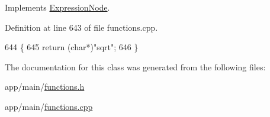 Implements \hyperlink{classExpressionNode_a42a5e9562b0f645a19dcc83f698069b5}{Expression\+Node}.



Definition at line 643 of file functions.\+cpp.


\begin{DoxyCode}
644 \{
645     \textcolor{keywordflow}{return} (\textcolor{keywordtype}{char}*)\textcolor{stringliteral}{"sqrt"};
646 \}
\end{DoxyCode}


The documentation for this class was generated from the following files\+:\begin{DoxyCompactItemize}
\item 
app/main/\hyperlink{functions_8h}{functions.\+h}\item 
app/main/\hyperlink{functions_8cpp}{functions.\+cpp}\end{DoxyCompactItemize}
